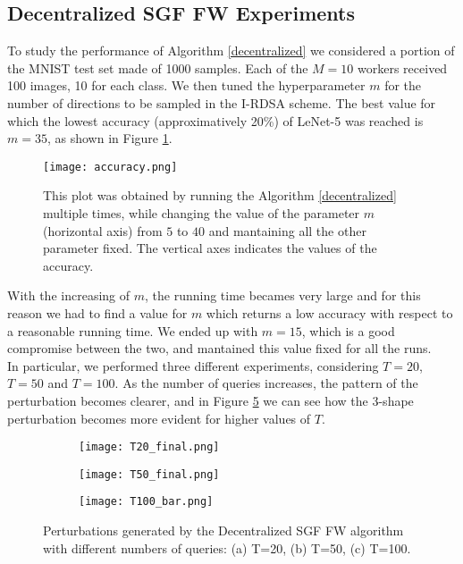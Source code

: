\subsection{Decentralized SGF FW Experiments}
To study the performance of Algorithm \ref{decentralized} we considered a portion of the MNIST test set made of 1000 samples. Each of the $M=10$ workers received 100 images, 10 for each class.
We then tuned the hyperparameter $m$ for the number of directions to be sampled in the I-RDSA scheme. The best value for which the lowest accuracy (approximatively 20\%) of LeNet-5 was reached is $m=35$, as shown in Figure \ref{fig:accuracy}.\\
\begin{figure}[htbp]
	\centering
	\texttt{[image: accuracy.png]}
	\caption{{\small This plot was obtained by running the Algorithm \ref{decentralized} multiple times, while changing the value of the parameter $m$ (horizontal axis) from $5$ to $40$ and mantaining all the other parameter fixed. The vertical axes indicates the values of the accuracy.}}
	\label{fig:accuracy}
\end{figure}
\indent With the increasing of $m$, the running time becames very large and for this reason we had to find a value for $m$ which returns a low accuracy with respect to a reasonable running time. We ended up with $m=15$, which is a good compromise between the two, and mantained this value fixed for all the runs.\\
\indent In particular, we performed three different experiments, considering $T=20$, $T=50$ and $T=100$. As the number of queries increases, the pattern of the perturbation becomes clearer, and in Figure \ref{fig:decentralized_perturbations} we can see how the 3-shape perturbation becomes more evident for higher values of $T$. 
\begin{figure}[h]
	\centering
	\begin{subfigure}[b]{0.15\textwidth}
		\centering
		\texttt{[image: T20\_final.png]}
		\caption{}
		\label{fig:decentralized_perturbation_20}
	\end{subfigure}
	\hfill
	\begin{subfigure}[b]{0.15\textwidth}
		\texttt{[image: T50\_final.png]}
		\caption{}
		\label{fig:decentralized_perturbation_50}
	\end{subfigure}
	\hfill
	\begin{subfigure}[b]{0.15\textwidth}
		\texttt{[image: T100\_bar.png]}
		\caption{}
		\label{fig:decentralized_perturbation_100}
	\end{subfigure}
	\caption{{\small Perturbations generated by the Decentralized SGF FW algorithm with different numbers of queries: (a) T=20, (b) T=50, (c) T=100.}}
	\label{fig:decentralized_perturbations}
\end{figure}


